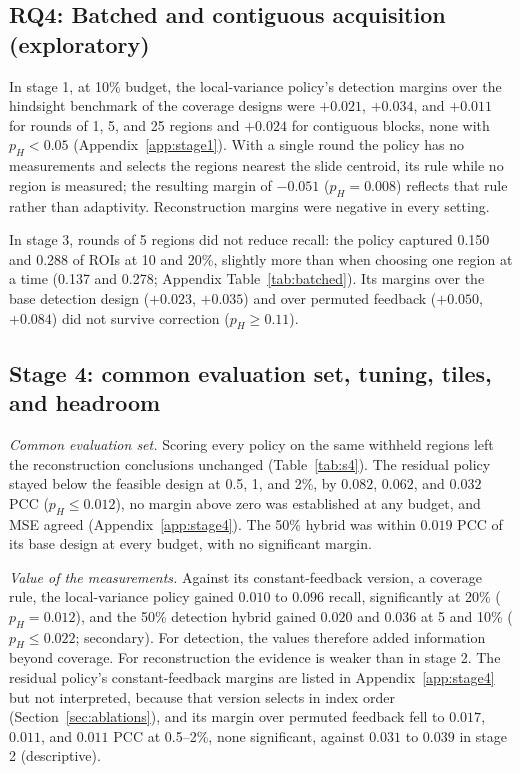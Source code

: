\documentclass[10pt]{article}
\newcommand{\fittable}[1]{\resizebox{\ifdim\width>\linewidth\linewidth\else\width\fi}{!}{#1}}
\begin{document}
\begin{table}[t]
\centering
\caption{Stage-3 primary margins: hybrid minus its base design run for the whole budget, 22 slides.
The 50\% and 80\% hybrids take that share of regions from the base design and the rest from the feedback policy. $\Delta$
with unadjusted 95\% CI resampling studies; $p_H$ Holm-adjusted over the 20 primary margins; MDE$_H$ at 80\% power
and $\alpha=0.05/20$.}
\label{tab:s3}
\fittable{}
\end{table}


\subsection{RQ4: Batched and contiguous acquisition (exploratory)}
In stage 1, at 10\% budget, the local-variance policy's detection margins over the hindsight benchmark of the
coverage designs were
$+0.021$, $+0.034$, and $+0.011$ for rounds of 1, 5, and 25 regions and $+0.024$ for contiguous blocks, none with
$p_H<0.05$ (Appendix~\ref{app:stage1}). With a single round the policy has no measurements and selects the regions
nearest the slide centroid, its rule while no region is measured; the resulting margin of $-0.051$ ($p_H=0.008$) reflects that
rule rather than adaptivity. Reconstruction margins were negative in every setting.

In stage 3, rounds of 5 regions did not reduce recall: the policy captured 0.150 and 0.288 of ROIs at 10 and 20\%,
slightly more than when choosing one region at a time (0.137 and 0.278; Appendix Table~\ref{tab:batched}). Its margins over
the base detection design ($+0.023$, $+0.035$) and over permuted feedback ($+0.050$, $+0.084$) did not survive
correction ($p_H\ge0.11$).

\subsection{Stage 4: common evaluation set, tuning, tiles, and headroom}
\emph{Common evaluation set.} Scoring every policy on the same withheld regions left the reconstruction conclusions
unchanged (Table~\ref{tab:s4}). The residual policy stayed below the feasible design at 0.5, 1, and 2\%, by $0.082$,
$0.062$, and $0.032$ PCC ($p_H\le0.012$), no margin above zero was established at any budget, and MSE agreed
(Appendix~\ref{app:stage4}). The 50\% hybrid was within $0.019$ PCC of its base design at every budget, with no
significant margin.

\emph{Value of the measurements.} Against its constant-feedback version, a coverage rule, the local-variance policy
gained $0.010$ to $0.096$ recall, significantly at 20\% ($p_H=0.012$), and the 50\% detection hybrid gained $0.020$
and $0.036$ at 5 and 10\% ($p_H\le0.022$; secondary). For detection, the values therefore added information beyond
coverage. For reconstruction the evidence is weaker than in stage 2. The residual policy's constant-feedback margins are
listed in Appendix~\ref{app:stage4} but not interpreted, because that version selects in index order
(Section~\ref{sec:ablations}), and its margin over permuted feedback fell to $0.017$, $0.011$, and $0.011$ PCC at
0.5--2\%, none significant, against $0.031$ to $0.039$ in stage 2 (descriptive).
\end{document}
